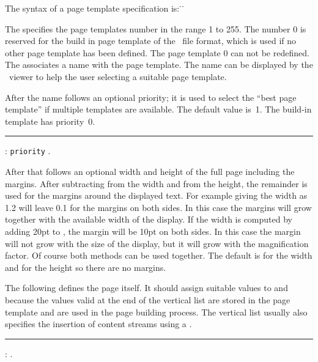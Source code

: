 The syntax of a page template specification is:
 \opt{\.{=}}  
  
\.{\LB} \.{\RB}


The  specifies the page templates number in the range 1
to 255.  The number 0 is reserved for the build in page template of
the \HINT\ file format, which is used if no other page template has
been defined. The page template 0 can not be redefined.
The  associates a name with the page template.  The name can
be displayed by the \HINT\ viewer to help the user selecting a
suitable page template.

After the name follows an optional priority; it is used to select the
``best page template'' if multiple templates are available. The
default value is~1. The build-in template has priority~0.

\medskip
\rule{}: {\tt priority} .
\medskip


After that follows an optional width and height of the full page
including the margins.  After subtracting  from the width
and  from the height, the remainder is used for the margins
around the displayed text.  For example giving the width as
1.2 will leave 0.1 for the margins on both sides.
In this case the margins will grow together with the available width
of the display.  If the width is computed by adding 20pt
to , the margin will be 10pt on both sides.  In this case
the margin will not grow with the size of the display, but it will
grow with the magnification factor.  Of course both methods can be
used together.  The default is  for the width and 
for the height so there are no margins.

The following  defines the page itself. It should assign suitable values
to  and  because the values valid at the end of the vertical list
are stored in the page template and are used in the page building process. 
The vertical list usually also specifies the insertion of content streams using a .

\medskip
\rule{}:
   .
\medskip

